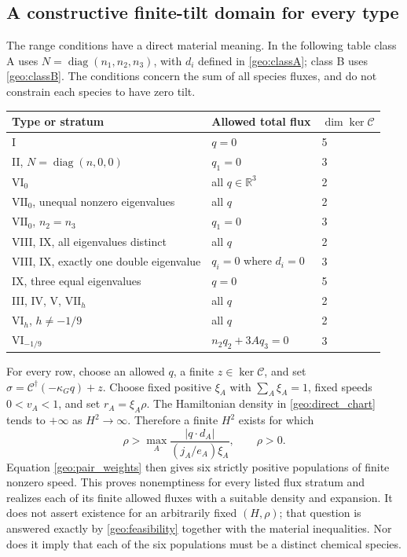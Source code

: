 \subsection{A constructive finite-tilt domain for every type}
\label{geo:all_type_tilt}
The range conditions have a direct material meaning. In the following table class A uses $N=\operatorname{diag}(n_1,n_2,n_3)$, with $d_i$ defined in \eqref{geo:classA}; class B uses \eqref{geo:classB}. The conditions concern the sum of all species fluxes, and do not constrain each species to have zero tilt.
\begin{center}
\begin{tabular}{lll}
\hline
Type or stratum&Allowed total flux&$\dim\ker\mathcal C$\\\hline
I&$q=0$&5\\
II, $N=\operatorname{diag}(n,0,0)$&$q_1=0$&3\\
$\mathrm{VI}_0$&all $q\in\mathbb R^3$&2\\
$\mathrm{VII}_0$, unequal nonzero eigenvalues&all $q$&2\\
$\mathrm{VII}_0$, $n_2=n_3$&$q_1=0$&3\\
VIII, IX, all eigenvalues distinct&all $q$&2\\
VIII, IX, exactly one double eigenvalue&$q_i=0$ where $d_i=0$&3\\
IX, three equal eigenvalues&$q=0$&5\\
III, IV, V, $\mathrm{VII}_h$&all $q$&2\\
$\mathrm{VI}_h$, $h\ne-1/9$&all $q$&2\\
$\mathrm{VI}_{-1/9}$&$n_2q_2+3Aq_3=0$&3\\\hline
\end{tabular}
\end{center}
For every row, choose an allowed $q$, a finite $z\in\ker\mathcal C$, and set $\sigma=\mathcal C^\dagger(-\kappa_Gq)+z$. Choose fixed positive $\xi_A$ with $\sum_A\xi_A=1$, fixed speeds $0<v_A<1$, and set $r_A=\xi_A\rho$. The Hamiltonian density in \eqref{geo:direct_chart} tends to $+\infty$ as $H^2\to\infty$. Therefore a finite $H^2$ exists for which
\begin{equation}
 \rho>\max_A\frac{|q\cdot d_A|}{(j_A/e_A)\xi_A},\qquad \rho>0.
 \label{geo:tilt_positive_domain}
\end{equation}
Equation \eqref{geo:pair_weights} then gives six strictly positive populations of finite nonzero speed. This proves nonemptiness for every listed flux stratum and realizes each of its finite allowed fluxes with a suitable density and expansion. It does not assert existence for an arbitrarily fixed $(H,\rho)$; that question is answered exactly by \eqref{geo:feasibility} together with the material inequalities. Nor does it imply that each of the six populations must be a distinct chemical species.

